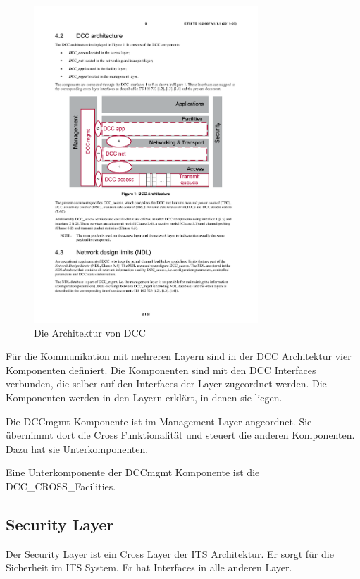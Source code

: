 \begin{figure}
	\includegraphics[width=0.75\textwidth]{content/images/02_architektur/dccArchitektur.pdf}
	\caption{Die Architektur von DCC \cite{etsi102687}}
	\label{fig:architektur_dccArchitektur}
\end{figure}

Für die Kommunikation mit mehreren Layern sind in der  \ac{DCC} Architektur vier Komponenten definiert. Die Komponenten sind mit den \ac{DCC} Interfaces verbunden, die selber auf den Interfaces der Layer zugeordnet werden. Die Komponenten werden in den Layern erklärt, in denen sie liegen. 

Die DCCmgmt Komponente ist im Management Layer angeordnet. Sie übernimmt dort die Cross Funktionalität und steuert die anderen Komponenten. Dazu hat sie Unterkomponenten.

Eine Unterkomponente der DCCmgmt Komponente ist die DCC\_CROSS\_Facilities. 




\subsection{Security Layer \label{architektur_securityLayer}}
Der Security Layer ist ein Cross Layer der \ac{ITS} Architektur. Er sorgt für die Sicherheit im \ac{ITS} System. Er hat Interfaces in alle anderen Layer. 	 

